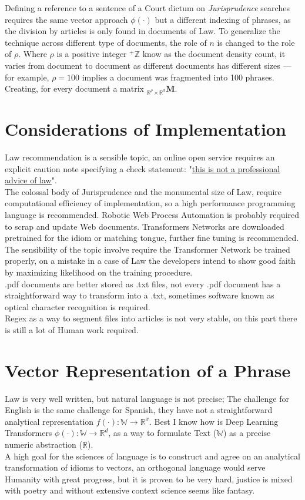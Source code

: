\documentclass[a4paper,fleqn]{cas-sc}
\begin{document}
Defining a reference to a sentence of a Court dictum on \textit{Jurisprudence} searches requires the same vector approach $\phi(\cdot)$ 
but a different indexing of phrases, as the division by articles is only found in documents of Law. To generalize 
the technique across different type of documents, the role of $n$ is changed to the role of $\rho$. Where $\rho$ is a positive integer 
${}^{+}\mathbb{Z}$ know as the document density count, it varies from document to document as different documents has different sizes ---
for example, $\rho=100$ implies a document was fragmented into 100 phrases. Creating, 
for every document a matrix ${}_{\mathbb{R}^{\rho}\times\mathbb{R}^{d}}{\mathbf{M}}$.\\

\section{Considerations of Implementation}
Law recommendation is a sensible topic, an online open service requires an explicit caution note specifying a check statement: 
"\color{red}\underline{this is not a professional advice of law}\color{black}". \\
\noindent
The colossal body of Jurisprudence 
and the monumental size of Law, require computational efficiency of implementation, so a high performance programming language is 
recommended. Robotic Web Process Automation is probably required to scrap and update Web documents. 
Transformers Networks are downloaded pretrained for the idiom or matching tongue, further fine tuning is recommended. \\
The sensibility of the topic involve require the Transformer Network be trained properly, 
on a mistake in a case of Law the developers intend to show good faith by maximizing likelihood on the training procedure. \\
.pdf documents are better stored as .txt files, not every .pdf document has a straightforward way to 
transform into a .txt, sometimes software known as optical character recognition is required. \\
Regex as a way to segment files into articles is not very stable, on this part there is still a lot of Human work required. 

\section{Vector Representation of a Phrase}
Law is very well written, but natural language is not precise; The challenge for English is the same challenge for Spanish, 
they have not a straightforward analytical representation $f(\cdot): \mathbb{W}\rightarrow\mathbb{R}^{x}$. 
Best I know how is Deep Learning Transformers $\phi(\cdot): \mathbb{W}\rightarrow\mathbb{R}^{d}$, 
as a way to formulate Text ($\mathbb{W}$) as a precise numeric abstraction ($\mathbb{R}$). \\
A high goal for the sciences of language is to construct and agree on an analytical transformation of idioms to vectors, 
an orthogonal language would serve Humanity with great progress, but it is proven to be very hard, justice is mixed 
with poetry and without extensive context science seems like fantasy. \\
\end{document}
